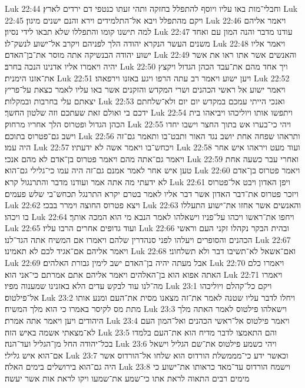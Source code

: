 Luk 22:44  וחבלי־מות באו עליו ויוסף להתפלל בחזקה ותהי זעתו כנטפי דם ירדים לארץ׃
Luk 22:45  ויקם מהתפלל ויבא אל־התלמידים וירא והנם ישנים מיגון׃
Luk 22:46  ויאמר אליהם למה תישנו קומו והתפללו שלא תבאו לידי נסיון׃
Luk 22:47  עודנו מדבר והנה המון עם ואחד משנים העשר הנקרא יהודה הלך לפניהם ויקרב אל־ישוע לנשק־לו׃
Luk 22:48  ויאמר אליו ישוע יהודה הבנשיקה אתה מוסר את־בן־האדם׃
Luk 22:49  והאנשים אשר אתו ראו את אשר יהיה ויאמרו אליו אדנינו הנכה בחרב׃
Luk 22:50  ויך אחד מהם את־עבד הכהן הגדול ויקצץ את־אזנו הימנית׃
Luk 22:51  ויען ישוע ויאמר רב עתה הרפו ויגע באזנו וירפאהו׃
Luk 22:52  ויאמר ישוע אל ראשי הכהנים ושרי המקדש והזקנים אשר באו עליו לאמר כצאת על־פריץ יצאתם עלי בחרבות ובמקלות׃
Luk 22:53  ואנכי הייתי עמכם במקדש יום יום ולא־שלחתם ידכם בי ואולם זאת שעתכם וזה שלטון החשך׃
Luk 22:54  ויתפשו אותו ויוליכהו ויביאהו בית הכהן הגדול ופטרוס הלך אחריו מרחוק׃
Luk 22:55  ויהי כי־בערו אש בתוך החצר וישבו יחדו וישב גם־פטרוס בתוכם׃
Luk 22:56  ותראהו שפחה אחת יושב נגד האור ותבט־בו ותאמר גם־זה היה עמו׃
Luk 22:57  ויכחש־בו ויאמר אשה לא ידעתיו׃
Luk 22:58  ועוד מעט ויראהו איש אחר ויאמר גם־אתה מהם ויאמר פטרוס בן־אדם לא מהם אנכי׃
Luk 22:59  ואחרי עבר כשעה אחת טען איש אחר לאמר אמנם גם־זה היה עמו כי־גלילי גם־הוא׃
Luk 22:60  ויאמר פטרוס בן־אדם לא ידעתי מה אתה אמר ועודנו מדבר והתרנגול קרא׃
Luk 22:61  ויפן האדון ויבט אל־פטרוס ויזכר פטרוס את־דבר האדון אשר דבר אליו לאמר בטרם יקרא התרנגל תכחש־בי שלש פעמים׃
Luk 22:62  ויצא פטרוס החוצה וימרר בבכי׃
Luk 22:63  והאנשים אשר אחזו את־ישוע התעללו בו ויכהו׃
Luk 22:64  ויחפו את־ראשו ויכהו על־פניו וישאלהו לאמר הנבא מי הוא המכה אותך׃
Luk 22:65  ועוד גדופים אחרים הרבו עליו׃
Luk 22:66  ובהית הבקר נקהלו זקני העם וראשי הכהנים והסופרים ויעלהו לפני סנהדרין שלהם ויאמרו אם המשיח אתה הגד־לנו׃
Luk 22:67  ויאמר אליהם אם־אגיד לכם לא תאמינו׃
Luk 22:68  ואם־אשאל לא־תשיבו דבר ולא תשלחוני׃
Luk 22:69  אבל מעתה יהיה בן־האדם ישב לימין גבורת האלהים׃
Luk 22:70  ויאמרו כלם האתה אפוא הוא בן־האלהים ויאמר אליהם אתם אמרתם כי־אני הוא׃
Luk 22:71  ויאמרו מה־לנו עוד לבקש עדים הלא באזנינו שמענוה מפיו׃
Luk 23:1  ויקם כל־קהלם ויוליכהו אל־פילטוס׃
Luk 23:2  ויחלו לדבר עליו שטנה לאמר את־זה מצאנו מסית את־העם ומנע אותו מתת מס לקיסר באמרו כי הוא מלך המשיח׃
Luk 23:3  וישאלהו פילטוס לאמר האתה מלך היהודים ויען ויאמר אתה אמרת׃
Luk 23:4  ויאמר פילטוס אל־ראשי הכהנים ואל־המון העם לא־מצאתי אשמה באיש הזה׃
Luk 23:5  והם התאמצו לדבר מדיח הוא את־העם בלמדו בכל־יהודה החל מן־הגליל ועד־הנה׃
Luk 23:6  ויהי כשמע פילטוס את־שם הגליל וישאל אם־הוא איש גלילי׃
Luk 23:7  וכאשר ידע כי־מממשלת הורדוס הוא שלחו אל־הורדוס אשר היה גם־הוא בירושלים בימים האלה׃
Luk 23:8  וישמח הורדוס עד־מאד כראותו את־ישוע כי מימים רבים התאוה לראת אתו כי־שמע את־שמעו ויקו לראת אות אשר יעשה׃
